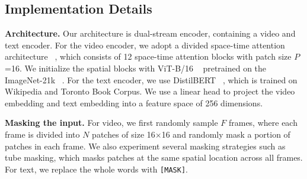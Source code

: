 \documentclass[10pt,twocolumn,letterpaper]{article}
\begin{document}
\begin{table*}[htb]
{\begin{tabular}
        \bottomrule
    \end{tabular}
	}\vspace{-2mm}
    \caption
    {Text-to-video retrieval results on ActivityNet(180s), DiDeMo(28s) and MSVD(10s) with various video duration. \textbf{Architecture}: $V$, $T$, and $C$ are video, text, and cross-modal encoder, respectively. $U$ is a uni-encoder for video and text. $V^{expert}$ are a set of experts for feature aggregation. $V^{det}$ is a detector for ROI features. $V^{pem}$ is an encoder for prompt engineering. $V^{mcq}$ is an encoder for the pretext task MCQ. $V^{ema}$ is an encoder for EMA updating. \textbf{\# Pairs} and \textbf{\# Frames} are the number of pairs and frames for pre-training. 
     }\vspace{-2mm}
    \label{table: i21k-activitynet-didemo-msvd}


\end{table*}

\vspace{-1mm}\subsection{Implementation Details}
\noindent\textbf{Architecture.} Our architecture is dual-stream encoder, containing a video and text encoder. For the video encoder, we adopt a divided space-time attention architecture ~\cite{timesformer, vivit}, which consists of 12 space-time attention blocks with patch size $P$=16. We initialize the spatial blocks with ViT-B/16 ~\cite{vit} pretrained on the ImageNet-21k ~\cite{imagenet}. For the text encoder, we use DistilBERT ~\cite{distilbert}, which is trained on Wikipedia and Toronto Book Corpus. We use a linear head to project the video embedding and text embedding into a feature space of 256 dimensions. 

\vspace{1mm}\noindent\textbf{Masking the input.} For video, we first randomly sample $F$ frames, where each frame is divided into $N$ patches of size 16$\times$16 and randomly mask a portion of patches in each frame. We also experiment several masking strategies such as tube masking, which masks patches at the same spatial location across all frames. For text, we replace the whole words with \verb+[MASK]+. 
\end{document}
